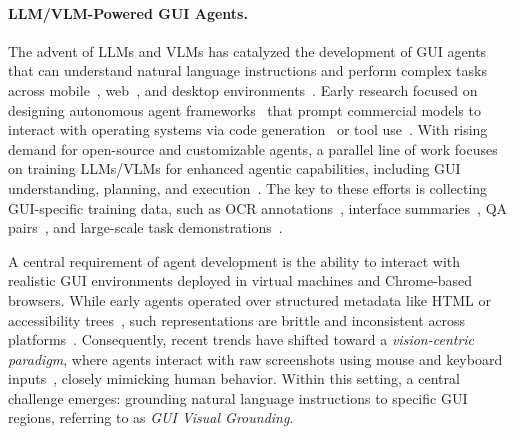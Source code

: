 \paragraph{LLM/VLM-Powered GUI Agents.}
The advent of LLMs and VLMs has catalyzed the development of GUI agents that can understand natural language instructions and perform complex tasks across mobile~\citep{rawles2024androidworld}, web~\citep{zhou2023webarena, deng2023mind2web}, and desktop environments~\citep{xie2024osworld, zhang2024ufo, zhang2025ufo2}. 
Early research focused on designing autonomous agent frameworks~\citep{zheng2024gpt, wu2024copilot, jia2024agentstore} that prompt commercial models to interact with operating systems via code generation~\citep{sun2024survey, sun2025scienceboard} or tool use~\citep{zhang2025appagent,zhang2025api}. 
With rising demand for open-source and customizable agents, a parallel line of work focuses on training LLMs/VLMs for enhanced agentic capabilities, including GUI understanding, planning, and execution~\citep{xu2024aguvis, qin2025ui, chen2024guicourse, chai2024amex}. The key to these efforts is collecting GUI-specific training data, such as OCR annotations~\citep{lu2024gui}, interface summaries~\citep{you2024ferret}, QA pairs~\citep{chen2024guicourse}, and large-scale task demonstrations~\citep{deng2023mind2web, rawles2023androidinthewild, zhang2024android, zheng2025vem, sun2024genesis, cheng2024vision, zhang2025breaking}. 

A central requirement of agent development is the ability to interact with realistic GUI environments deployed in virtual machines and Chrome-based browsers.
While early agents operated over structured metadata like HTML or accessibility trees~\citep{zhou2023webarena, he2024webvoyager}, such representations are brittle and inconsistent across platforms~\citep{cheng2024seeclick, xu2024aguvis}. Consequently, recent trends have shifted toward a \emph{vision-centric paradigm}, where agents interact with raw screenshots using mouse and keyboard inputs~\citep{openai2025operator, anthropic2024cuda}, closely mimicking human behavior. Within this setting, a central challenge emerges: grounding natural language instructions to specific GUI regions, referring to as \textit{GUI Visual Grounding}.

